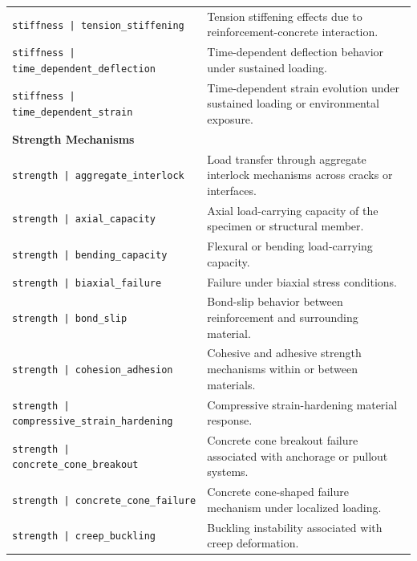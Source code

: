 \documentclass[11pt]{book}
\begin{document}
{\begin{longtable}{p{}p{}}
\texttt{stiffness | tension\_stiffening} &
Tension stiffening effects due to reinforcement-concrete interaction. \\

\texttt{stiffness | time\_dependent\_deflection} &
Time-dependent deflection behavior under sustained loading. \\

\texttt{stiffness | time\_dependent\_strain} &
Time-dependent strain evolution under sustained loading or environmental exposure. \\

\hline
\multicolumn{2}{l}{\textbf{Strength Mechanisms}}\\
\hline

\texttt{strength | aggregate\_interlock} &
Load transfer through aggregate interlock mechanisms across cracks or interfaces. \\

\texttt{strength | axial\_capacity} &
Axial load-carrying capacity of the specimen or structural member. \\

\texttt{strength | bending\_capacity} &
Flexural or bending load-carrying capacity. \\

\texttt{strength | biaxial\_failure} &
Failure under biaxial stress conditions. \\

\texttt{strength | bond\_slip} &
Bond-slip behavior between reinforcement and surrounding material. \\

\texttt{strength | cohesion\_adhesion} &
Cohesive and adhesive strength mechanisms within or between materials. \\

\texttt{strength | compressive\_strain\_hardening} &
Compressive strain-hardening material response. \\

\texttt{strength | concrete\_cone\_breakout} &
Concrete cone breakout failure associated with anchorage or pullout systems. \\

\texttt{strength | concrete\_cone\_failure} &
Concrete cone-shaped failure mechanism under localized loading. \\

\texttt{strength | creep\_buckling} &
Buckling instability associated with creep deformation. \\


\end{longtable}}
\end{document}
